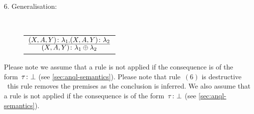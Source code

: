 \begin{description}
\ifnormalisedardf%
\else%
  \item[6. Generalisation:]~ \\[0.5em]
    \begin{tabular}{l}
      $$
    \end{tabular}
\fi%
\end{description}
%
\ifnormalisedardf%
Please note we assume that a rule is not applied if the consequence is of the form~$\fuzzyg{\tau}{\bot}$ (see
\cref{sec:anql-semantics}).
%  
\else%
Please note that rule~$(6)$ is destructive \ie~this rule removes the premises as the conclusion is inferred.
%
We also assume that a rule is not applied if the consequence is of the form~$\fuzzyg{\tau}{\bot}$ 
%
(see \cref{sec:anql-semantics}).
\fi%


\begin{comment}
%
Alternatively, rules~2--5 can be represented concisely using the following inference rule:
%
\begin{center}
  \begin{tabular}{cl}
    $(AG)$ & $
    {
    }$
  \end{tabular}
\end{center}
%
\nd Essentially, this rule says that if a classical \ac{RDFS} triple~$\tau$ can be inferred by applying a classical
\ac{RDFS} inference rule to triples~$\tau_{1}, \ldots, \tau_{n}$ (denoted~$\{\tau_{1}, \ldots, \tau_{n}\}
\vdash_{} \tau$), then the annotation term of~$\tau$ will be~$\bigotimes_{i} \lambda_{i}$,
where~$\lambda_{i}$ is the annotation of triple~$\tau_{i}$.  It follows immediately that, using rule~$(AG)$, in
addition to~\ifnormalisedardf rule~$1$~\else rules~$1$ and~$6$~\fi from the deductive system above, it is easy to
extend these rules to cover complete \ac{RDFS}.
%
\end{comment}


